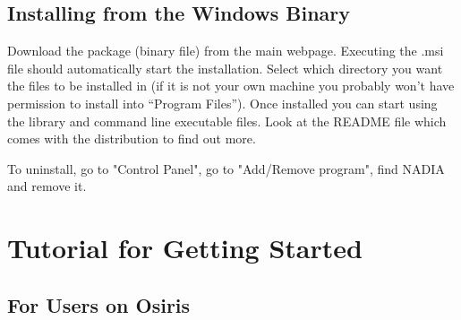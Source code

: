 \documentclass[]{cxs-software}
\begin{document}

\subsection{Installing from the Windows Binary}

Download the package (binary file) from the main webpage. Executing
the .msi file should automatically start the installation. Select
which directory you want the files to be installed in (if it is not
your own machine you probably won't have permission to install into
``Program Files''). Once installed you can start using the library and
command line executable files. Look at the README file which comes
with the distribution to find out more. 

To uninstall, go to "Control Panel", go to "Add/Remove program", find
NADIA and remove it.


\newpage

\section{Tutorial for Getting Started}
\label{getting started}

\subsection{For Users on Osiris}
\end{document}
